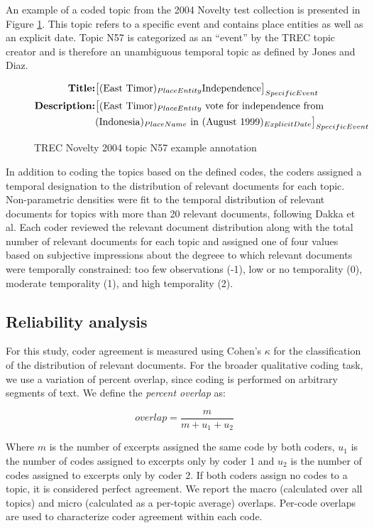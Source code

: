 \documentclass{sig-alternate}
\begin{document}
An example of a coded topic from the 2004 Novelty test collection is presented in Figure \ref{fig.example}.  This topic refers to a specific event and contains place entities as well as an explicit date.  Topic N57 is categorized as an ``event'' by the TREC topic creator and is therefore an unambiguous temporal topic as defined by Jones and Diaz.

\begin{figure}[!ht]
\tiny
\begin{equation*}
\begin{split}
\mbox{\bf{Title}:} & \big[(\mbox{East Timor})_{PlaceEntity} \mbox{Independence}\big]_{SpecificEvent} \\
\mbox{\bf{Description}:} & \big[  (\mbox{East Timor})_{PlaceEntity} \mbox{ vote for independence from } \\
	& (\mbox{Indonesia})_{PlaceName} \mbox{ in } (\mbox{August 1999})_{ExplicitDate}\big]_{SpecificEvent}
\end{split}
\end{equation*}
\caption{TREC Novelty 2004 topic N57 example annotation}
\label{fig.example}
\end{figure}

In addition to coding the topics based on the defined codes, the coders assigned a temporal designation to the distribution of relevant documents for each topic. Non-parametric densities were fit to the temporal distribution of relevant documents for topics with more than 20 relevant documents, following Dakka et al. Each coder reviewed the relevant document distribution along with the total number of relevant documents for each topic and assigned one of four values based on subjective impressions about the degreee to which relevant documents were temporally constrained:  too few observations (-1), low or no temporality (0), moderate temporality (1), and high temporality (2). 
\subsection{Reliability analysis}

For this study, coder agreement is measured using Cohen's $\kappa$ for the classification of the distribution of relevant documents. For the broader qualitative coding task, we use a variation of percent overlap, since coding is performed on arbitrary segments of text. We define the \emph{percent overlap} as:

\[
overlap = \frac{m}{m + u_1 + u_2} 
\]

Where $m$ is the number of excerpts assigned the same code by both coders, $u_1$ is the number of codes assigned to excerpts only by coder 1 and $u_2$ is the number of codes assigned to excerpts only by coder 2. If both coders assign no codes to a topic, it is considered perfect agreement. We report the macro (calculated over all topics) and micro (calculated as a per-topic average) overlaps.  Per-code overlaps are used to characterize coder agreement within each code.
\end{document}
